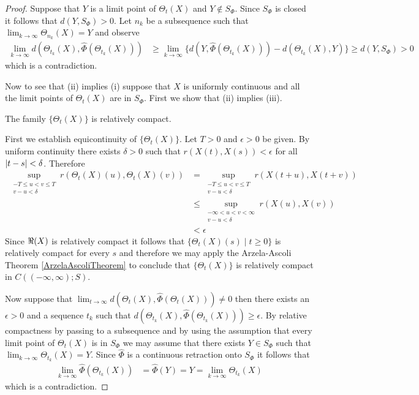 \begin{proof}
Suppose that $Y$ is a limit point of $\Theta_t(X)$ and $Y \notin S_\Phi$.  Since $S_\Phi$ is closed it follows that $d(Y, S_\Phi) > 0$.  Let $n_k$ be a subsequence such that $\lim_{k \to \infty} \Theta_{n_k}(X) = Y$ and observe
\begin{align*}
\lim_{k \to \infty} d(\Theta_{t_k}(X), \hat{\Phi}(\Theta_{t_k}(X))) &\geq \lim_{k \to \infty} \lbrace d(Y, \hat{\Phi}(\Theta_{t_k}(X))) - d(\Theta_{t_k}(X),Y)\rbrace \geq d(Y, S_\Phi) > 0
\end{align*}
which is a contradiction.

Now to see that (ii) implies (i) suppose that $X$ is uniformly continuous and all the limit points of $\Theta_t(X)$ are in $S_\Phi$.  First we show that (ii) implies (iii).
\begin{clm}The family $\lbrace \Theta_t(X) \rbrace$ is relatively compact.
\end{clm}
First we establish equicontinuity of $\lbrace \Theta_t(X) \rbrace$.  Let $T > 0$ and $\epsilon > 0$ be given.  By uniform continuity there exists $\delta > 0$ such that $r(X(t), X(s)) < \epsilon$ for all $\left \vert t-s \right \vert<\delta$. Therefore
\begin{align*}
  \sup_{\substack{-T \leq u<v \leq T \\ v-u<\delta}} r(\Theta_t(X)(u), \Theta_t(X)(v)) &= \sup_{\substack{-T \leq u<v \leq T \\ v-u<\delta}} r(X(t+u), X(t+v)) \\
                                                                                       &\leq \sup_{\substack{-\infty <  u<v <\infty\\ v-u<\delta}} r(X(u), X(v)) \\
                                                                                       &< \epsilon
\end{align*}
Since $\Re(X)$ is relatively compact it follows that $\lbrace \Theta_t(X)(s) \mid t \geq 0 \rbrace$ is relatively compact for every $s$ and therefore we may apply the Arzela-Ascoli Theorem \ref{ArzelaAscoliTheorem} to conclude that $\lbrace \Theta_t(X) \rbrace$ is relatively compact in $C((-\infty,\infty); S)$.  

Now suppose that $\lim_{t \to \infty} d(\Theta_t(X), \hat{\Phi}(\Theta_t(X))) \neq 0$ then there exists an $\epsilon > 0$ and a sequence $t_k$ such that $d(\Theta_{t_k}(X), \hat{\Phi}(\Theta_{t_k}(X))) \geq \epsilon$.  By relative compactness by passing to a subsequence and by using the assumption that every limit point of $\Theta_t(X)$ is in $S_\Phi$  we may assume that there exists $Y \in S_\Phi$ such that $\lim_{k \to \infty} \Theta_{t_k}(X) = Y$.  Since $\hat{\Phi}$ is a continuous retraction onto $S_\Phi$ it follows that 
\begin{align*}
\lim_{k \to \infty} \hat{\Phi}(\Theta_{t_k}(X)) &= \hat{\Phi}( Y) = Y = \lim_{k \to \infty} \Theta_{t_k}(X) 
\end{align*}
which is a contradiction.
\end{proof}

